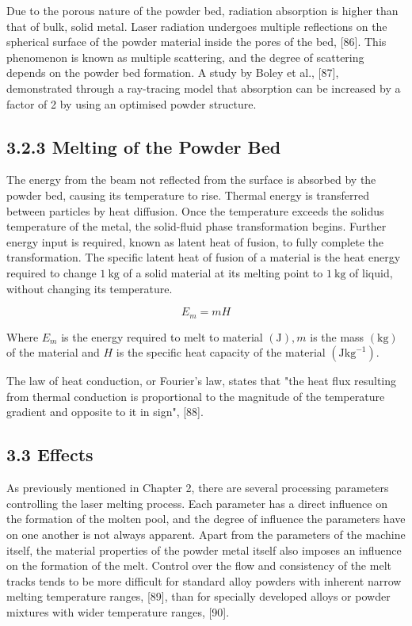 \documentclass[10pt]{article}
\begin{document}
Due to the porous nature of the powder bed, radiation absorption is higher than that of bulk, solid metal. Laser radiation undergoes multiple reflections on the spherical surface of the powder material inside the pores of the bed, [86]. This phenomenon is known as multiple scattering, and the degree of scattering depends on the powder bed formation. A study by Boley et al., [87], demonstrated through a ray-tracing model that absorption can be increased by a factor of 2 by using an optimised powder structure.

\subsection*{3.2.3 Melting of the Powder Bed}
The energy from the beam not reflected from the surface is absorbed by the powder bed, causing its temperature to rise. Thermal energy is transferred between particles by heat diffusion. Once the temperature exceeds the solidus temperature of the metal, the solid-fluid phase transformation begins. Further energy input is required, known as latent heat of fusion, to fully complete the transformation. The specific latent heat of fusion of a material is the heat energy required to change $1 \mathrm{~kg}$ of a solid material at its melting point to $1 \mathrm{~kg}$ of liquid, without changing its temperature.


\begin{equation*}
E_{m}=m H \tag{3}
\end{equation*}


Where $E_{m}$ is the energy required to melt to material $(\mathrm{J}), m$ is the mass $(\mathrm{kg})$ of the material and $H$ is the specific heat capacity of the material $\left(\mathrm{Jkg}^{-1}\right)$.

The law of heat conduction, or Fourier's law, states that "the heat flux resulting from thermal conduction is proportional to the magnitude of the temperature gradient and opposite to it in sign", [88].

\subsection*{3.3 Effects}
As previously mentioned in Chapter 2, there are several processing parameters controlling the laser melting process. Each parameter has a direct influence on the formation of the molten pool, and the degree of influence the parameters have on one another is not always apparent. Apart from the parameters of the machine itself, the material properties of the powder metal itself also imposes an influence on the formation of the melt. Control over the flow and consistency of the melt tracks tends to be more difficult for standard alloy powders with inherent narrow melting temperature ranges, [89], than for specially developed alloys or powder mixtures with wider temperature ranges, [90].
\end{document}
